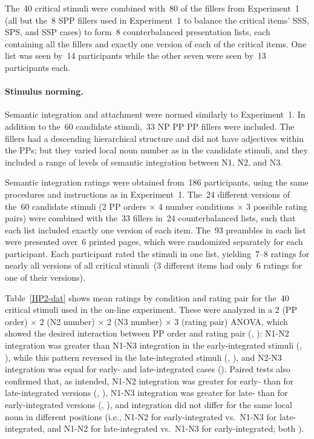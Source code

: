 \documentclass[12pt,titlepage]{article}
\newcommand{\IGNORE}[1]{} %
\newcommand{\showp}[1]{\IGNORE{#1}} %
\begin{document}
The~40 critical stimuli were combined with~80 of the fillers from
Experiment~1 (all but the~8 SPP fillers used in Experiment~1 to balance the
critical items' SSS, SPS, and SSP cases) to form~8 counterbalanced
presentation lists, each containing all the fillers and exactly one version
of each of the critical items.  One list was seen by~14 participants while
the other seven were seen by~13 participants each.

\paragraph{Stimulus norming.} Semantic integration and attachment were
normed similarly to Experiment~1.  In addition to the~60 candidate
stimuli,~33 NP PP PP fillers were included.  The fillers had a
descending hierarchical structure and did not have adjectives within
the PPs; but they varied local noun number as in the candidate
stimuli, and they included a range of levels of semantic integration
between N1, N2, and N3.

Semantic integration ratings were obtained from~186 participants, using the
same procedures and instructions as in Experiment~1.  The~24 different
versions of the~60 candidate stimuli (2 PP orders $\times$ 4 number
conditions $\times$ 3 possible rating pairs) were combined with the~33
fillers in~24 counterbalanced lists, such that each list included exactly
one version of each item.  The~93 preambles in each list were presented
over~6 printed pages, which were randomized separately for each
participant.  Each participant rated the stimuli in one list, yielding~7--8
ratings for nearly all versions of all critical stimuli~(3 different items
had only~6 ratings for one of their versions).

Table~\ref{HP2-dat} shows mean ratings by condition and rating pair for
the~40 critical stimuli used in the on-line experiment.  These were
analyzed in a 2 (PP order) $\times$ 2 (N2 number) $\times$ 2 (N3 number)
$\times$ 3 (rating pair) ANOVA, which showed the desired interaction
between PP order and rating pair (, \showp{,
\p{001}}): N1-N2 integration was greater than N1-N3 integration in the
early-integrated stimuli (, \showp{, \p{001}}),
while this pattern reversed in the late-integrated stimuli
(, \showp{, \p{001}}), and N2-N3 integration was
equal for early- and late-integrated cases (\Fweak).  Paired tests also
confirmed that, as intended, N1-N2 integration was greater for early- than
for late-integrated versions (, \showp{,
\p{001}}), N1-N3 integration was greater for late- than for
early-integrated versions (, \showp{, \p{001}}),
and integration did not differ for the same local noun in different
positions (i.e., N1-N2 for early-integrated vs.\ N1-N3 for late-integrated,
and N1-N2 for late-integrated vs.\ N1-N3 for early-integrated; both
\Fsweak).
\end{document}
